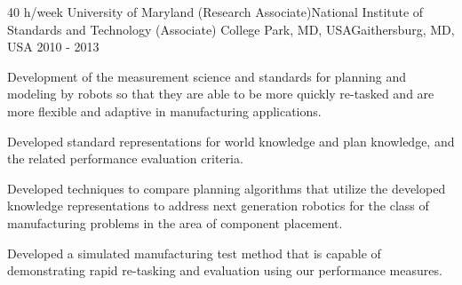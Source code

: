 \begin{cventries}
\cventry
{40 h/week} %
{University of Maryland (Research Associate)\newline National Institute of Standards and Technology (Associate)} %
{College Park, MD, USA\newline Gaithersburg, MD, USA} %
{2010 - 2013} %
{ %
\begin{cvitems}
\item {Development of the measurement science and standards for planning and
modeling by robots so that they are able to be more quickly re-tasked and
are more flexible and adaptive in manufacturing applications.}
    \begin{cvitems2}
    \item {Developed standard representations for world knowledge and plan knowledge, and the related performance evaluation criteria. }
    \item {Developed techniques to compare planning algorithms that utilize the developed knowledge representations to address next generation robotics for the class of manufacturing problems in the area of component placement.}
    \item {Developed a simulated manufacturing test method that is capable of demonstrating rapid re-tasking and evaluation using our performance measures.}
    \end{cvitems2}
\end{cvitems}
}



\end{cventries}
